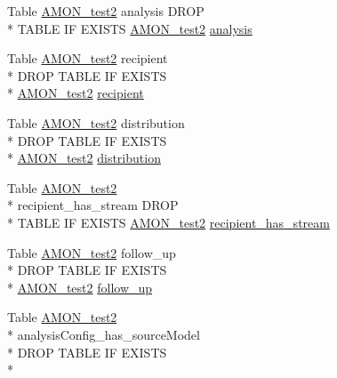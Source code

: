 \begin{DoxyCompactItemize}
\item 
Table \hyperlink{db__mc__build_8sql_a19c21c59303d8b6591b92240ff7de1d5}{A\-M\-O\-N\-\_\-test2} analysis D\-R\-O\-P \\*
T\-A\-B\-L\-E I\-F E\-X\-I\-S\-T\-S \hyperlink{db__mc__build_8sql_a19c21c59303d8b6591b92240ff7de1d5}{A\-M\-O\-N\-\_\-test2} \hyperlink{db__mc__build_8sql_a69c1258a339f0520ae8780c2caf56220}{analysis}
\item 
Table \hyperlink{db__mc__build_8sql_a19c21c59303d8b6591b92240ff7de1d5}{A\-M\-O\-N\-\_\-test2} recipient \\*
D\-R\-O\-P T\-A\-B\-L\-E I\-F E\-X\-I\-S\-T\-S \\*
\hyperlink{db__mc__build_8sql_a19c21c59303d8b6591b92240ff7de1d5}{A\-M\-O\-N\-\_\-test2} \hyperlink{db__mc__build_8sql_ab1bb798436f3119e40c17076157bac00}{recipient}
\item 
Table \hyperlink{db__mc__build_8sql_a19c21c59303d8b6591b92240ff7de1d5}{A\-M\-O\-N\-\_\-test2} distribution \\*
D\-R\-O\-P T\-A\-B\-L\-E I\-F E\-X\-I\-S\-T\-S \\*
\hyperlink{db__mc__build_8sql_a19c21c59303d8b6591b92240ff7de1d5}{A\-M\-O\-N\-\_\-test2} \hyperlink{db__mc__build_8sql_a1afd0620c93835c58beb36aa90a68d92}{distribution}
\item 
Table \hyperlink{db__mc__build_8sql_a19c21c59303d8b6591b92240ff7de1d5}{A\-M\-O\-N\-\_\-test2} \\*
recipient\-\_\-has\-\_\-stream D\-R\-O\-P \\*
T\-A\-B\-L\-E I\-F E\-X\-I\-S\-T\-S \hyperlink{db__mc__build_8sql_a19c21c59303d8b6591b92240ff7de1d5}{A\-M\-O\-N\-\_\-test2} \hyperlink{db__mc__build_8sql_ac0780f1034c332e43fb4ac08abb5f78e}{recipient\-\_\-has\-\_\-stream}
\item 
Table \hyperlink{db__mc__build_8sql_a19c21c59303d8b6591b92240ff7de1d5}{A\-M\-O\-N\-\_\-test2} follow\-\_\-up \\*
D\-R\-O\-P T\-A\-B\-L\-E I\-F E\-X\-I\-S\-T\-S \\*
\hyperlink{db__mc__build_8sql_a19c21c59303d8b6591b92240ff7de1d5}{A\-M\-O\-N\-\_\-test2} \hyperlink{db__mc__build_8sql_a03112b3e5b52253e85f8e8d3797c13e8}{follow\-\_\-up}
\item 
Table \hyperlink{db__mc__build_8sql_a19c21c59303d8b6591b92240ff7de1d5}{A\-M\-O\-N\-\_\-test2} \\*
analysis\-Config\-\_\-has\-\_\-source\-Model \\*
D\-R\-O\-P T\-A\-B\-L\-E I\-F E\-X\-I\-S\-T\-S \\*

\end{DoxyCompactItemize}
